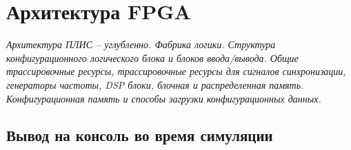 \chapter{Архитектура FPGA}

\emph{Архитектура ПЛИС – углубленно. Фабрика логики. Структура конфигурационного логического блока и блоков ввода/вывода. Общие трассировочные ресурсы, трассировочные ресурсы для сигналов синхронизации, генераторы частоты, DSP блоки, блочная и распределенная память. Конфигурационная память и способы загрузки конфигурационных данных.}

\section{Вывод на консоль во время симуляции}
